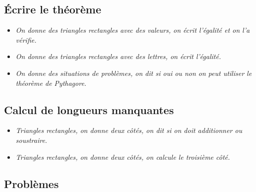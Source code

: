\documentclass[12pt]{article}
\begin{document}
\subsection*{Écrire le théorème}

\begin{itemize}
	\item \textit{On donne des triangles rectangles avec des valeurs, on écrit l'égalité et on l'a vérifie.}
	\item \textit{On donne des triangles rectangles avec des lettres, on écrit l'égalité.}
	\item \textit{On donne des situations de problèmes, on dit si oui ou non on peut utiliser le théorème de Pythagore.}
\end{itemize}

\subsection*{Calcul de longueurs manquantes}

\begin{itemize}
	\item \textit{Triangles rectangles, on donne deux côtés, on dit si on doit additionner ou soustraire.}
	\item \textit{Triangles rectangles, on donne deux côtés, on calcule le troisième côté.}
\end{itemize}

\subsection*{Problèmes}
\end{document}
